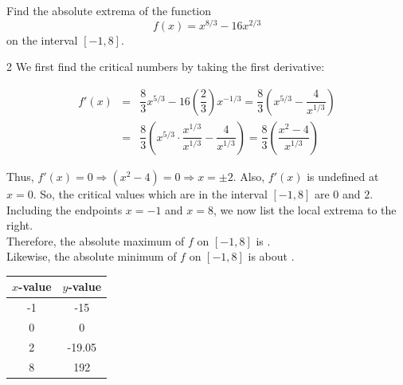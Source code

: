 \documentclass{book}
\begin{document}
\begin{Exam} Find the absolute extrema of the function \[f(x) = x^{8/3} - 16x^{2/3}\] on the interval $[-1, 8]$.\\

\begin{multicols}{2}
We first find the critical numbers by taking the first derivative: 

\begin{eqnarray*}
f'(x) &=& \dfrac{8}{3}x^{5/3} - 16\left(\dfrac{2}{3}\right)x^{-1/3} = \dfrac{8}{3}\left(x^{5/3} - \dfrac{4}{x^{1/3}}\right)\\
&=& \dfrac{8}{3}\left(x^{5/3}\cdot\dfrac{x^{1/3}}{x^{1/3}} - \dfrac{4}{x^{1/3}}\right) = \dfrac{8}{3}\left(\dfrac{x^2 - 4}{x^{1/3}}\right)
\end{eqnarray*} 

Thus, $f'(x) = 0 \Rightarrow (x^2-4) = 0 \Rightarrow x = \pm 2$. Also, $f'(x)$ is undefined at $x = 0$. So, the critical values which are in the interval $[-1,8]$ are $0$ and $2$. Including the endpoints $x=-1$ and $x=8$, we now list the local extrema to the right.\\

Therefore, the absolute maximum of $f$ on $[-1, 8]$ is .\\

 Likewise, the absolute minimum of $f$ on $[-1, 8]$ is about .\vfill

\begin{center}
\begin{tabular}{c|c}

$x$-value & $y$-value \\ \hline
-1 & -15 \\ 
0 & 0 \\ 
2 & -19.05 \\ 
8 & 192 \\ 
\end{tabular}
\end{center}


\end{multicols}
\end{Exam}
\end{document}
